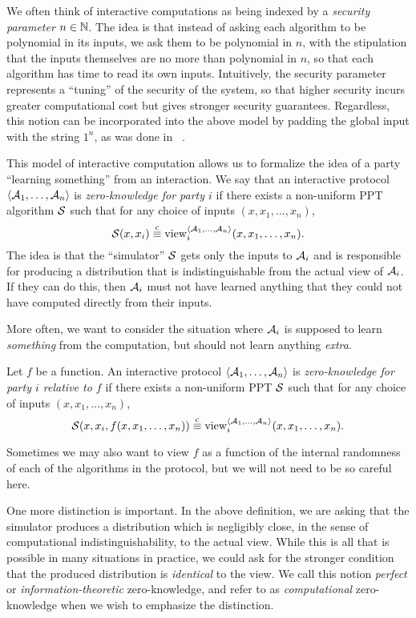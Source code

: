 We often think of interactive computations as being indexed by a \emph{security
parameter} $n\in\mathbb{N}$. The idea is that instead of asking each algorithm to be
polynomial in its inputs, we ask them to be polynomial in $n$, with the
stipulation that the inputs themselves are no more than polynomial in $n$, so
that each algorithm has time to read its own inputs. Intuitively, the security
parameter represents a ``tuning'' of the security of the system, so that higher
security incurs greater computational cost but gives stronger security
guarantees. Regardless, this notion can be incorporated into the above model by
padding the global input with the string $1^n$, as was done
in ~.

This model of interactive computation allows us to formalize the idea of a party
``learning something'' from an interaction. We say that an interactive
protocol $\langle\mathcal{A}_1, \dots, \mathcal{A}_n\rangle$ is \emph{zero-knowledge for party $i$} if
there exists a non-uniform PPT algorithm $\mathcal{S}$ such that
for any choice of inputs $(x, x_1, \dots, x_n)$, \[
  \mathcal{S}(x, x_i) \overset{\text{c}}{\equiv} \operatorname{view}_i^{\langle\mathcal{A}_1, \dots, \mathcal{A}_n\rangle}(x, x_1, \dots, x_n).
\]
The idea is that the ``simulator'' $\mathcal{S}$ gets only the inputs to $\mathcal{A}_i$ and is
responsible for producing a distribution that is indistinguishable from the
actual view of $\mathcal{A}_i$. If they can do this, then $\mathcal{A}_i$ must not have learned
anything that they could not have computed directly from their inputs.

More often, we want to consider the situation where $\mathcal{A}_i$ is supposed to learn
\emph{something} from the computation, but should not learn anything
\emph{extra}.

\begin{dfn}\label{def:zero-knowledge}
  Let $f$ be a function. An interactive protocol $\langle\mathcal{A}_1, \dots, \mathcal{A}_n\rangle$ is
  \emph{zero-knowledge for party $i$ relative to $f$} if there exists a non-uniform
  PPT $\mathcal{S}$ such that for any choice of
  inputs $(x, x_1, \dots, x_n)$, \[
  \mathcal{S}(x, x_i, f(x, x_1, \dots, x_n)) \overset{\text{c}}{\equiv} \operatorname{view}_i^{\langle\mathcal{A}_1, \dots, \mathcal{A}_n\rangle}(x, x_1, \dots, x_n).
\]
\end{dfn}

Sometimes we may also want to view $f$ as a function of the internal randomness
of each of the algorithms in the protocol, but we will not need to be so careful
here.

One more distinction is important. In the above definition, we are asking that
the simulator produces a distribution which is negligibly close, in the sense of
computational indistinguishability, to the actual view. While this is all that
is possible in many situations in practice, we could ask for the stronger
condition that the produced distribution is \emph{identical} to the view. We
call this notion \emph{perfect} or \emph{information-theoretic} zero-knowledge,
and refer to  as
\emph{computational} zero-knowledge when we wish to emphasize the distinction.

